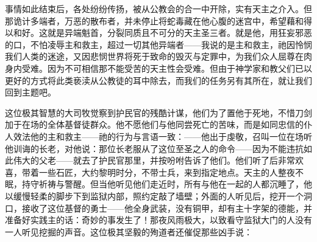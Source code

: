 事情如此结束后，各处纷纷传扬，被从公教会的合一中开除，实有天主之介入。但那诡计多端者，万恶的散布者，并未停止将蛇毒藏在他心腹的迷宫中，希望藉和得以和好。这就是异端魁首，分裂同质且不可分的天主圣三者。就是他，用狂妄邪恶的口，不怕凌辱主和救主，超过一切其他异端者——我说的是主和救主，祂因怜悯我们人类的迷途，又因悲悯世界将死于致命的毁灭与定罪中，为我们众人屈尊在肉身内受难。因为不可相信那不能受苦的天主性会受难。但由于神学家和教父们已以更好的方式将此类亵渎从公教徒的耳中除去，而我们的任务另有其所在，就让我们回到主题吧。\par

这位极其智慧的大司牧觉察到护民官的残酷计谋，他们为了置他于死地，不惜刀剑加于在场的全体基督徒群众。他不愿他们与他同尝死亡的苦味，而是如同忠信的仆人效法他的主和救主——祂的行为与言语一致：——他出于虔敬，召叫一位在场听他训诲的长老，对他说：那位长老服从了这位至圣之人的命令——因为不能违抗如此伟大的父老——就去了护民官那里，并按吩咐告诉了他们。他们听了后非常欢喜，带着一些石匠，大约黎明时分，不带士兵，来到指定地点。天主的人整夜不眠，持守祈祷与警醒。但当他听见他们走近时，所有与他在一起的人都沉睡了，他以缓慢轻柔的脚步下到监狱内部，照约定敲了墙壁；外面的人听见后，挖开一个洞口，接收了这位基督的勇士——他全身武装，没有铜甲，却有主十字架的德能，并准备好实践主的话：奇妙的事发生了！那夜风雨极大，以致看守监狱大门的人没有一人听见挖掘的声音。这位极其坚毅的殉道者还催促那些凶手说：\par

